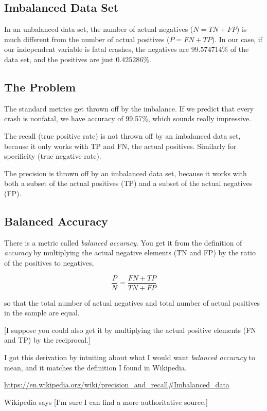 \documentclass[11pt]{article}
\begin{document}
\begin{spacing}{1.2}
\subsection{Imbalanced Data Set}

In an unbalanced data set, the number of actual negatives ($N = TN + FP$) is much different from the number of actual positives ($P = FN + TP$).  In our case, if our independent variable is fatal crashes, the negatives are $99.574714\%$ of the data set, and the positives are just $0.425286\%$.

\subsection{The Problem}

The standard metrics get thrown off by the imbalance.  If we predict that every crash is nonfatal, we have accuracy of 99.57\%, which sounds really impressive.  

The recall (true positive rate) is not thrown off by an imbalanced data set, because it only works with TP and FN, the actual positives.  Similarly for specificity (true negative rate).

The precision is thrown off by an imbalanced data set, because it works with both a subset of the actual positives (TP) and a subset of the actual negatives (FP).  

\subsection{Balanced Accuracy}

There is a metric called {\it balanced accuracy}.  You get it from the definition of {\it accuracy} by multiplying the actual negative elements (TN and FP) by the ratio of the positives to negatives, 

$$\frac{P}{N} = \frac{FN+TP}{TN+FP}$$

so that the total number of actual negatives and total number of actual positives in the sample are equal.

[I suppose you could also get it by multiplying the actual positive elements (FN and TP) by the reciprocal.]

I got this derivation by intuiting about what I would want {\it balanced accuracy} to mean, and it matches the definition I found in Wikipedia.  

\url{https://en.wikipedia.org/wiki/precision_and_recall#Imbalanced_data}

Wikipedia says [I'm sure I can find a more authoritative source.]


\end{spacing}
\end{document}
